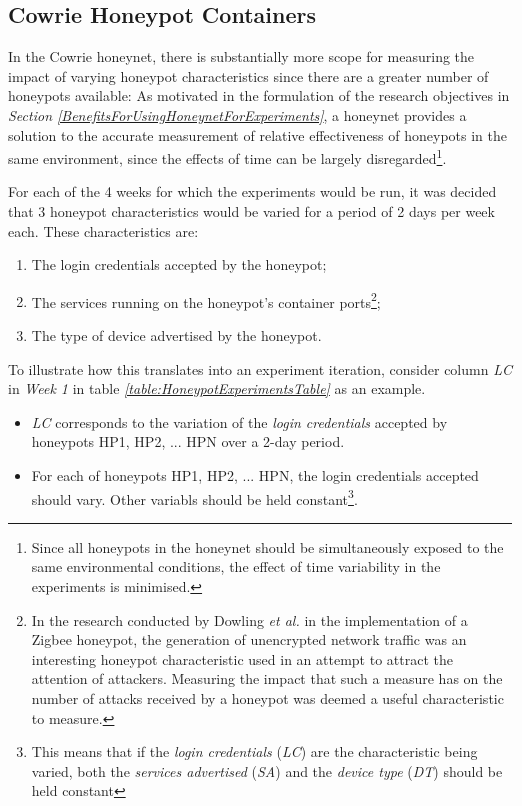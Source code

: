 \subsection{Cowrie Honeypot Containers}
In the Cowrie honeynet, there is substantially more scope for measuring the impact of varying honeypot characteristics since there are a greater number of honeypots available: As motivated in the formulation of the research objectives in \textit{Section \ref{BenefitsForUsingHoneynetForExperiments}}, a honeynet provides a solution to the accurate measurement of relative effectiveness of honeypots in the same environment, since the effects of time can be largely disregarded\footnote{Since all honeypots in the honeynet should be simultaneously exposed to the same environmental conditions, the effect of time variability in the experiments is minimised.}.
% 
% 

For each of the 4 weeks for which the experiments would be run, it was decided that 3 honeypot characteristics would be varied for a period of 2 days per week each. These characteristics are:


\begin{enumerate}
\item The login credentials accepted by the honeypot;
\item The services running on the honeypot's container ports\footnote{In the research conducted by Dowling \textit{et al.} in the implementation of a Zigbee honeypot, the generation of unencrypted network traffic was an interesting honeypot characteristic used in an attempt to attract the attention of attackers. \cite{Dowling2017} Measuring the impact that such a measure has on the number of attacks received by a honeypot was deemed a useful characteristic to measure.};
\item The type of device advertised by the honeypot.
\end{enumerate}

To illustrate how this translates into an experiment iteration, consider column \textit{LC} in \textit{Week 1} in table \textit{\ref{table:HoneypotExperimentsTable}} as an example.
\begin{itemize}
\item \textit{LC} corresponds to the variation of the \textit{login credentials} accepted by honeypots HP1, HP2, ... HPN over a 2-day period.
\item For each of honeypots HP1, HP2, ... HPN, the login credentials accepted should vary. Other variabls should be held constant\footnote{This means that if the \textit{login credentials} (\textit{LC}) are the characteristic being varied, both the \textit{services advertised} (\textit{SA}) and the \textit{device type} (\textit{DT}) should be held constant}.
\end{itemize}


